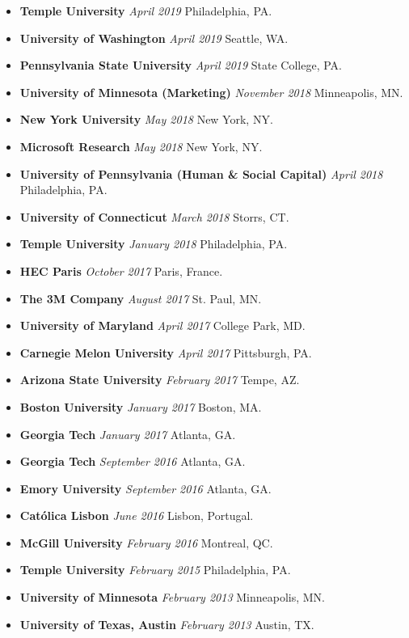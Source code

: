 \documentclass[10.5pt,letterpaper,sans]{moderncv}        %
\begin{document}
\begin{itemize}
\item \textbf{Temple University} \textit{April 2019} Philadelphia, PA.
\item \textbf{University of Washington} \textit{April 2019} Seattle, WA.
\item \textbf{Pennsylvania State University} \textit{April 2019} State College, PA.
\item \textbf{University of Minnesota (Marketing)} \textit{November 2018} Minneapolis, MN.
\item \textbf{New York University} \textit{May 2018} New York, NY.
\item \textbf{Microsoft Research} \textit{May 2018} New York, NY.
\item \textbf{University of Pennsylvania (Human \& Social Capital)} \textit{April 2018} Philadelphia, PA.
\item \textbf{University of Connecticut} \textit{March 2018} Storrs, CT.
\item \textbf{Temple University} \textit{January 2018} Philadelphia, PA.
\item \textbf{HEC Paris} \textit{October 2017} Paris, France.
\item \textbf{The 3M Company} \textit{August 2017} St. Paul, MN.
\item \textbf{University of Maryland} \textit{April 2017} College Park, MD.
\item \textbf{Carnegie Melon University} \textit{April 2017} Pittsburgh, PA.
\item \textbf{Arizona State University} \textit{February 2017} Tempe, AZ.
\item \textbf{Boston University} \textit{January 2017} Boston, MA.
\item \textbf{Georgia Tech} \textit{January 2017} Atlanta, GA.
\item \textbf{Georgia Tech} \textit{September 2016} Atlanta, GA.
\item \textbf{Emory University} \textit{September 2016} Atlanta, GA.
\item \textbf{Cat\'olica Lisbon} \textit{June 2016} Lisbon, Portugal.
\item \textbf{McGill University} \textit{February 2016} Montreal, QC.
\item \textbf{Temple University} \textit{February 2015} Philadelphia, PA.
\item \textbf{University of Minnesota} \textit{February 2013} Minneapolis, MN.
\item \textbf{University of Texas, Austin} \textit{February 2013} Austin, TX.

\end{itemize}
\end{document}
